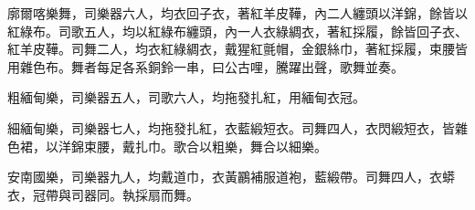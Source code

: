 \begin{pinyinscope}
廓爾喀樂舞，司樂器六人，均衣回子衣，著紅羊皮鞾，內二人纏頭以洋錦，餘皆以紅綠布。司歌五人，均以紅綠布纏頭，內一人衣綠綢衣，著紅採履，餘皆回子衣、紅羊皮鞾。司舞二人，均衣紅綠綢衣，戴猩紅氈帽，金銀絲巾，著紅採履，束腰皆用雜色布。舞者每足各系銅鈴一串，曰公古哩，騰躍出聲，歌舞並奏。

粗緬甸樂，司樂器五人，司歌六人，均拖發扎紅，用緬甸衣冠。

細緬甸樂，司樂器七人，均拖發扎紅，衣藍緞短衣。司舞四人，衣閃緞短衣，皆雜色裙，以洋錦束腰，戴扎巾。歌合以粗樂，舞合以細樂。

安南國樂，司樂器九人，均戴道巾，衣黃鸝補服道袍，藍緞帶。司舞四人，衣蟒衣，冠帶與司器同。執採扇而舞。


\end{pinyinscope}